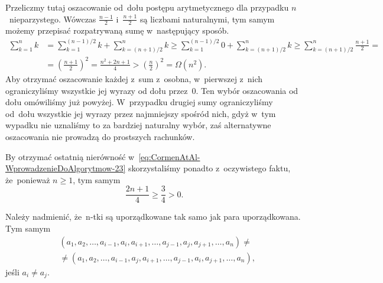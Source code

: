 \documentclass[a4paper,11pt]{article}
\begin{document}
\vspace{\spaceFour}





\noindent
{} Przeliczmy tutaj oszacowanie od~dołu postępu arytmetycznego
dla przypadku $n$~nieparzystego. Wówczas $\frac{ n - 1 }{ 2 }$
i~$\frac{ n + 1 }{ 2 }$ są liczbami naturalnymi, tym samym możemy przepisać
rozpatrywaną sumę w~następujący sposób.
\begin{equation}
  \label{eq:CormenAtAl-WprowadzenieDoAlgorytmow-23}
  \begin{split}
    \sum_{ k = 1 }^{ n } k
    &=
      \sum_{ k = 1 }^{ ( n - 1 ) / 2 } k + \sum_{ k = ( n + 1 ) / 2 }^{ n } k \geq
      \sum_{ k = 1 }^{ ( n - 1 ) / 2 } 0 + \sum_{ k = ( n + 1 ) / 2 }^{ n } k \geq
      \sum_{ k = ( n + 1 ) / 2 }^{ n } \frac{ n + 1 }{ 2 } = \\
    &= \left( \frac{ n + 1 }{ 2 } \right)^{ 2 } =
      \frac{ n^{ 2 } + 2n + 1 }{ 4 } >
      \left( \frac{ n }{ 2 } \right )^{ 2 } = \Omega( n^{ 2 } ).
  \end{split}
\end{equation}
Aby otrzymać oszacowanie każdej z~sum z~osobna, w~pierwszej z~nich
ograniczyliśmy wszystkie jej wyrazy od dołu przez~$0$. Ten wybór oszacowania
od dołu omówiliśmy już powyżej. W~przypadku drugiej sumy ograniczyliśmy
od~dołu wszystkie jej wyrazy przez najmniejszy spośród nich, gdyż w~tym
wypadku nie uznaliśmy to za bardziej naturalny wybór, zaś alternatywne
oszacowania nie prowadzą do prostszych rachunków.

By otrzymać ostatnią nierówność
w~\eqref{eq:CormenAtAl-WprowadzenieDoAlgorytmow-23} skorzystaliśmy ponadto
z~oczywistego faktu, że~ponieważ $n \geq 1$, tym samym
\begin{equation}
  \label{eq:CormenAtAl-WprowadzenieDoAlgorytmow-24}
  \frac{ 2n + 1 }{ 4 } \geq \frac{ 3 }{ 4 } > 0.
\end{equation}

\vspace{\spaceFour}





\noindent
{} Należy nadmienić, że~n-tki są uporządkowane tak samo jak para
uporządkowana. Tym samym
\begin{equation}
  \label{eq:CormenAtAl-WprowadzenieDoAlgorytmow-25}
  \begin{split}
    &( a_{ 1 }, a_{ 2 }, \ldots, a_{ i - 1 }, a_{ i }, a_{ i + 1 }, \ldots, a_{ j - 1 },
    a_{ j }, a_{ j + 1 }, \ldots, a_{ n } ) \neq \\
    &\neq ( a_{ 1 }, a_{ 2 }, \ldots, a_{ i - 1 }, a_{ j }, a_{ i + 1 }, \ldots,
    a_{ j - 1 }, a_{ i }, a_{ j + 1 }, \ldots, a_{ n } ),
  \end{split}
\end{equation}
jeśli $a_{ i } \neq a_{ j }$.
\end{document}

